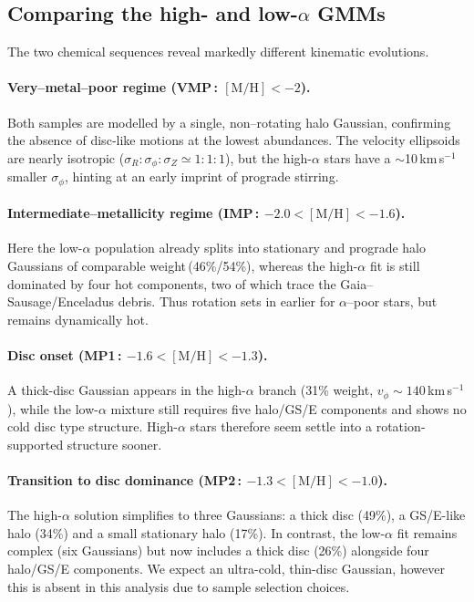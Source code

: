 \documentclass[a4paper,12pt]{article}
\begin{document}
\subsection{Comparing the high- and low-\texorpdfstring{$\alpha$}{α} GMMs}
\label{subsec:gmm_comparison}

The two chemical sequences reveal markedly different kinematic evolutions.

\paragraph{Very–metal–poor regime (VMP\,: $[\mathrm{M/H}]<-2$).}
Both samples are modelled by a single, non–rotating halo Gaussian,
confirming the absence of disc‐like motions at the lowest abundances.
The velocity ellipsoids are nearly isotropic
($\sigma_{R}\!:\!\sigma_{\phi}\!:\!\sigma_{Z}\!\simeq\!1\!:\!1\!:\!1$),
but the high-$\alpha$ stars have a $\sim$10\,km\,s$^{-1}$ smaller
$\sigma_{\phi}$, hinting at an early imprint of prograde stirring.

\paragraph{Intermediate–metallicity regime (IMP\,: $-2.0<[\mathrm{M/H}]<-1.6$).}
Here the low-$\alpha$ population already splits into
stationary and prograde halo Gaussians of comparable
weight\,(46\%/54\%), whereas the high-$\alpha$ fit is
still dominated by four hot components, two of which trace the
Gaia–Sausage/Enceladus debris.  Thus rotation sets in
earlier for $\alpha$–poor stars, but remains dynamically hot.

\paragraph{Disc onset (MP1\,: $-1.6<[\mathrm{M/H}]<-1.3$).}
A thick-disc Gaussian appears in the high-$\alpha$ branch
(31\% weight, $v_\phi\!\sim\!140$\,km\,s$^{-1}$), while the
low-$\alpha$ mixture still requires five halo/GS/E components and shows no
cold disc type structure.  High-$\alpha$ stars therefore seem settle into a
rotation‐supported structure sooner.

\paragraph{Transition to disc dominance (MP2\,: $-1.3<[\mathrm{M/H}]<-1.0$).}
The high-$\alpha$ solution simplifies to three Gaussians: a thick disc
(49\%), a GS/E-like halo (34\%) and a small stationary
halo (17\%).  In contrast, the low-$\alpha$ fit remains
complex (six Gaussians) but now includes a thick disc
(26\%) alongside four halo/GS/E components. We expect an ultra-cold,
thin-disc Gaussian, however this is absent in this analysis due to sample selection choices.
\end{document}

